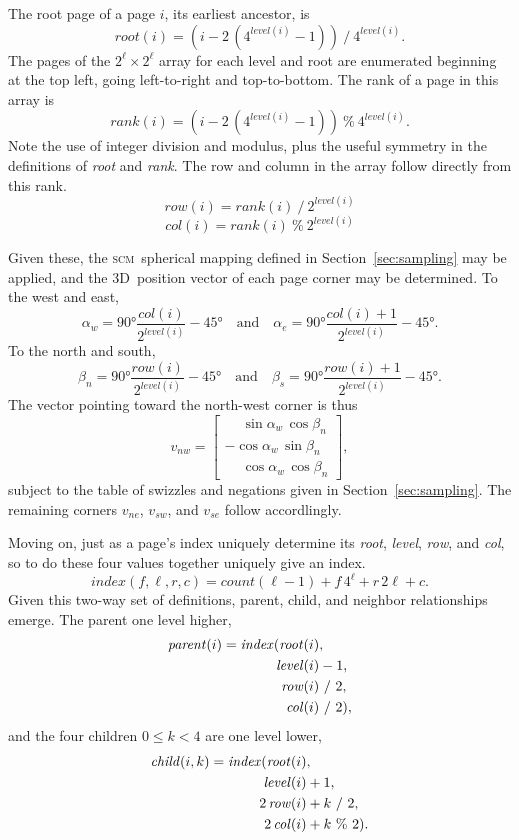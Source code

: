 \documentclass[oneside,10pt]{memoir}
\newcommand{\threed}  {3D}
\newcommand{\scm}     {\textsc{scm}}
\newcommand{\scmcount} [1]{\ensuremath{\mathit{count}(#1)}}
\newcommand{\scmlevel} [1]{\ensuremath{\mathit{level}(#1)}}
\newcommand{\scmroot}  [1]{\ensuremath{\mathit{root}(#1)}}
\newcommand{\scmrank}  [1]{\ensuremath{\mathit{rank}(#1)}}
\newcommand{\scmrow}   [1]{\ensuremath{\mathit{row}(#1)}}
\newcommand{\scmcol}   [1]{\ensuremath{\mathit{col}(#1)}}
\newcommand{\scmindex} [1]{\ensuremath{\mathit{index}(#1)}}
\newcommand{\scmparent}[1]{\ensuremath{\mathit{parent}(#1)}}
\newcommand{\scmchild} [1]{\ensuremath{\mathit{child}(#1)}}
\begin{document}
\begin{Spacing}{1.1}
The root page of a page $i$, its earliest ancestor, is
\[\scmroot{i}=(i-2\,(4^{\scmlevel{i}}-1))\ /\ 4^{\scmlevel{i}}.\]
The pages of the $2^\ell\times 2^\ell$ array for each level and root are enumerated beginning at the top left, going left-to-right and top-to-bottom. The rank of a page in this array is
\[\scmrank{i}=(i-2\,(4^{\scmlevel{i}}-1))\ \%\ 4^{\scmlevel{i}}.\]
Note the use of integer division and modulus, plus the useful symmetry in the definitions of \textit{root} and \textit{rank}. The row and column in the array follow directly from this rank.
\[\scmrow{i}=\scmrank{i}\ /\ 2^{\scmlevel{i}}\]
\[\scmcol{i}=\scmrank{i}\ \%\ 2^{\scmlevel{i}}\]

Given these, the \scm\ spherical mapping defined in Section~\ref{sec:sampling} may be applied, and the \threed\ position vector of each page corner may be determined. To the west and east,
\[\alpha_w=\ang{90}\frac{col(i)}{2^{\scmlevel{i}}}-\ang{45}\quad\textrm{and}\quad
  \alpha_e=\ang{90}\frac{col(i)+1}{2^{\scmlevel{i}}}-\ang{45}.\]
To the north and south,
\[\beta_n=\ang{90}\frac{row(i)}{2^{\scmlevel{i}}}-\ang{45}\quad\textrm{and}\quad
  \beta_s=\ang{90}\frac{row(i)+1}{2^{\scmlevel{i}}}-\ang{45}.\]
The vector pointing toward the north-west corner is thus
\[v_{nw}=\left[\begin{array}{c}
\phantom{-}\sin\alpha_w\, \cos\beta_n\\
        {-}\cos\alpha_w\, \sin\beta_n\\
\phantom{-}\cos\alpha_w\, \cos\beta_n
\end{array}\right],\]
subject to the table of swizzles and negations given in Section~\ref{sec:sampling}. The remaining corners $v_{ne}$, $v_{sw}$, and $v_{se}$ follow accordlingly.

Moving on, just as a page's index uniquely determine its \textit{root}, \textit{level}, \textit{row}, and \textit{col}, so to do these four values together uniquely give an index.
\[\scmindex{f, \ell, r, c}=\scmcount{\ell-1}+f\,4^\ell+r\,2\ell+c.\]
Given this two-way set of definitions, parent, child, and neighbor relationships emerge. The parent one level higher,
\begin{align*}
\scmparent{i}=\scmindex{\scmroot{i}&,\\
                        \scmlevel{i}&-1,\\
                        \scmrow{i}&\ /\ 2,\\
                        \scmcol{i}&\ /\ 2},
\end{align*}
and the four children $0\leq k < 4$ are one level lower,
\begin{align*}
\scmchild{i,k}=\scmindex{\scmroot{i}&,\\
                        \scmlevel{i}&+1,\\
                       2\,\scmrow{i}&+k\ /\ 2,\\
                       2\,\scmcol{i}&+k\ \%\ 2}.
\end{align*}


\end{Spacing}
\end{document}
